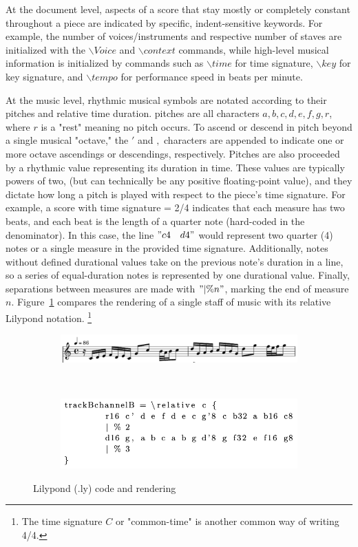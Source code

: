 \documentclass[review,sigconf]{acmart}
\begin{document}
At the document level, aspects of a score that stay mostly or completely constant throughout a piece are indicated by specific, indent-sensitive keywords.
For example, the number of voices/instruments and respective number of staves are initialized with the $\backslash{Voice}$ and $\backslash{context}$ commands,
while high-level musical information is initialized by commands such as $\backslash{time}$ for time signature, $\backslash{key}$ for key signature, and $\backslash{tempo}$ for performance speed in beats per minute.  

At the music level, rhythmic musical symbols are notated according to their pitches and relative time duration.
pitches are all characters ${a, b, c, d, e, f, g, r}$, where $r$ is a "rest" meaning no pitch occurs.
To ascend or descend in pitch beyond a single musical "octave," the $'$ and $,$ characters are appended to indicate one or more octave ascendings or descendings, respectively.
Pitches are also proceeded by a rhythmic value representing its duration in time.
These values are typically powers of two, (but can technically be any positive floating-point value), and they dictate how long a pitch is played with respect to the piece's time signature.
For example, a score with time signature = 2/4 indicates that each measure has two beats, and each beat is the length of a quarter note (hard-coded in the denominator).
In this case, the line $"c4 \quad d4"$ would represent two quarter (4) notes or a single measure in the provided time signature.
Additionally, notes without defined durational values take on the previous note's duration in a line, so a series of equal-duration notes is represented by one durational value.
Finally, separations between measures are made with $"| \% n"$, marking the end of measure $n$.
Figure~\ref{fig:lilypond-example} compares the rendering of a single staff of music with its relative Lilypond notation.
\footnote{The time signature $C$ or "common-time" is another common way of writing 4/4.}

\begin{figure}
	\begin{subfigure}
		\centering
		\includegraphics[width = .8\linewidth]{./figures/lilypond-snippet.png}
	\end{subfigure}
	~
	\begin{subfigure}
		\centering
		\includegraphics[width = .8\linewidth]{./figures/lilypond-code.png}
	\end{subfigure}
	\caption{Lilypond (.ly) code and rendering}
	\label{fig:lilypond-example}
\end{figure}
\end{document}
